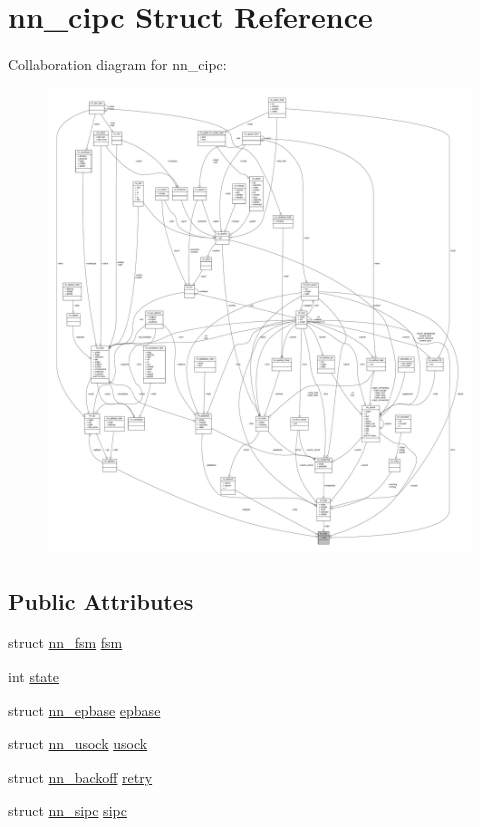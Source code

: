 \hypertarget{structnn__cipc}{}\section{nn\+\_\+cipc Struct Reference}
\label{structnn__cipc}


Collaboration diagram for nn\+\_\+cipc\+:\nopagebreak
\begin{figure}[H]
\begin{center}
\leavevmode
\includegraphics[width=350pt]{structnn__cipc__coll__graph}
\end{center}
\end{figure}
\subsection*{Public Attributes}
\begin{DoxyCompactItemize}
\item 
struct \hyperlink{structnn__fsm}{nn\+\_\+fsm} \hyperlink{structnn__cipc_ac3cb2e6f10f0e78f849c6aaa4ba6592a}{fsm}
\item 
int \hyperlink{structnn__cipc_af9b878e110d6071b4e693f3dd6e89213}{state}
\item 
struct \hyperlink{structnn__epbase}{nn\+\_\+epbase} \hyperlink{structnn__cipc_a767b765afab0b1be9653b01d30dbb36c}{epbase}
\item 
struct \hyperlink{structnn__usock}{nn\+\_\+usock} \hyperlink{structnn__cipc_a61f984db042983502c3d270326bd89d8}{usock}
\item 
struct \hyperlink{structnn__backoff}{nn\+\_\+backoff} \hyperlink{structnn__cipc_a7e238ae735a8050ae193bfa46195ed5e}{retry}
\item 
struct \hyperlink{structnn__sipc}{nn\+\_\+sipc} \hyperlink{structnn__cipc_a41de9ef8bc50161ae4ffd19e9ead3f06}{sipc}
\end{DoxyCompactItemize}


